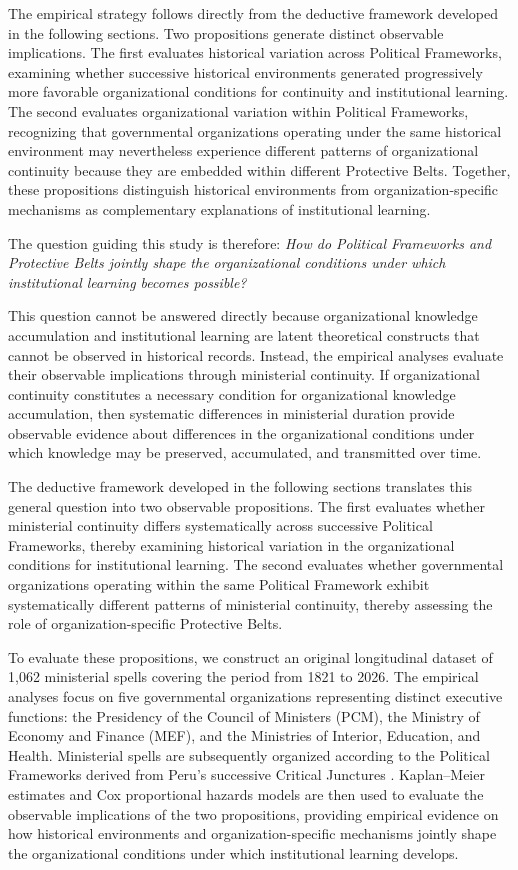 \documentclass[doc, 12pt, a4paper,floatsintext]{apa7}
\begin{document}
The empirical strategy follows directly from the deductive framework developed in the following sections. Two propositions generate distinct observable implications. The first evaluates historical variation across Political Frameworks, examining whether successive historical environments generated progressively more favorable organizational conditions for continuity and institutional learning. The second evaluates organizational variation within Political Frameworks, recognizing that governmental organizations operating under the same historical environment may nevertheless experience different patterns of organizational continuity because they are embedded within different Protective Belts. Together, these propositions distinguish historical environments from organization-specific mechanisms as complementary explanations of institutional learning.

The question guiding this study is therefore: \emph{How do Political Frameworks and Protective Belts jointly shape the organizational conditions under which institutional learning becomes possible?}

This question cannot be answered directly because organizational knowledge accumulation and institutional learning are latent theoretical constructs that cannot be observed in historical records. Instead, the empirical analyses evaluate their observable implications through ministerial continuity. If organizational continuity constitutes a necessary condition for organizational knowledge accumulation, then systematic differences in ministerial duration provide observable evidence about differences in the organizational conditions under which knowledge may be preserved, accumulated, and transmitted over time.

The deductive framework developed in the following sections translates this general question into two observable propositions. The first evaluates whether ministerial continuity differs systematically across successive Political Frameworks, thereby examining historical variation in the organizational conditions for institutional learning. The second evaluates whether governmental organizations operating within the same Political Framework exhibit systematically different patterns of ministerial continuity, thereby assessing the role of organization-specific Protective Belts.

To evaluate these propositions, we construct an original longitudinal dataset of 1,062 ministerial spells covering the period from 1821 to 2026. The empirical analyses focus on five governmental organizations representing distinct executive functions: the Presidency of the Council of Ministers (PCM), the Ministry of Economy and Finance (MEF), and the Ministries of Interior, Education, and Health. Ministerial spells are subsequently organized according to the Political Frameworks derived from Peru's successive Critical Junctures \parencite{lopez_jimenez_peru_2025}. Kaplan--Meier estimates and Cox proportional hazards models are then used to evaluate the observable implications of the two propositions, providing empirical evidence on how historical environments and organization-specific mechanisms jointly shape the organizational conditions under which institutional learning develops.
\end{document}
